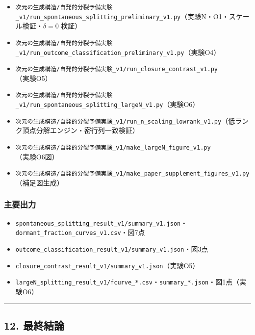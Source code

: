 \documentclass[
  a4paper,
]{ltjsarticle}
\providecommand{\tightlist}{%
  \setlength{\itemsep}{0pt}\setlength{\parskip}{0pt}}
\begin{document}
\begin{itemize}
\tightlist
\item
  \texttt{次元の生成構造/自発的分裂予備実験\_v1/run\_spontaneous\_splitting\_preliminary\_v1.py}（実験N・O1・スケール検証・\(\delta=0\)
  検証）
\item
  \texttt{次元の生成構造/自発的分裂予備実験\_v1/run\_outcome\_classification\_preliminary\_v1.py}（実験O4）
\item
  \texttt{次元の生成構造/自発的分裂予備実験\_v1/run\_closure\_contrast\_v1.py}（実験O5）
\item
  \texttt{次元の生成構造/自発的分裂予備実験\_v1/run\_spontaneous\_splitting\_largeN\_v1.py}（実験O6）
\item
  \texttt{次元の生成構造/自発的分裂予備実験\_v1/run\_n\_scaling\_lowrank\_v1.py}（低ランク頂点分解エンジン・密行列一致検証）
\item
  \texttt{次元の生成構造/自発的分裂予備実験\_v1/make\_largeN\_figure\_v1.py}（実験O6図）
\item
  \texttt{次元の生成構造/自発的分裂予備実験\_v1/make\_paper\_supplement\_figures\_v1.py}（補足図生成）
\end{itemize}

\subsubsection{主要出力}\label{ux4e3bux8981ux51faux529b}

\begin{itemize}
\tightlist
\item
  \texttt{spontaneous\_splitting\_result\_v1/summary\_v1.json}・\texttt{dormant\_fraction\_curves\_v1.csv}・図7点
\item
  \texttt{outcome\_classification\_result\_v1/summary\_v1.json}・図3点
\item
  \texttt{closure\_contrast\_result\_v1/summary\_v1.json}（実験O5）
\item
  \texttt{largeN\_splitting\_result\_v1/fcurve\_*.csv}・\texttt{summary\_*.json}・図1点（実験O6）
\end{itemize}

\begin{center}\rule{0.5\linewidth}{0.5pt}\end{center}

\subsection{12. 最終結論}\label{ux6700ux7d42ux7d50ux8ad6}
\end{document}
